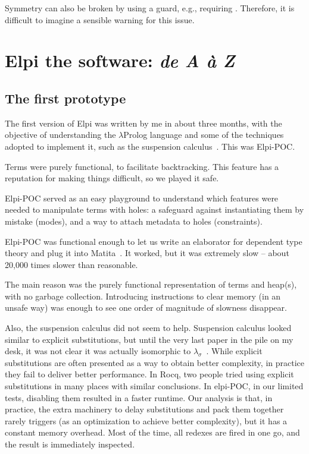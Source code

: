 \documentclass[a4paper, 11pt]{book}
\begin{document}
Symmetry can also be broken by using a guard, e.g., requiring
. Therefore, it is difficult to imagine a sensible warning for
this issue.



\chapter{Elpi the software: \emph{de A \`a Z}}

\section{The first prototype}\label{sec:poc}


The first version of Elpi was written by me in about three months, with the
objective of understanding the $\lambda$Prolog language and some of the
techniques adopted to implement it, such as the suspension
calculus~\cite{NADATHUR200235}. This was Elpi-POC.


Terms were purely functional, to facilitate backtracking. This feature has a
reputation for making things difficult, so we played it safe.


Elpi-POC served as an easy playground to understand which features were needed
to manipulate terms with holes: a safeguard against instantiating them by
mistake (modes), and a way to attach metadata to holes (constraints).


Elpi-POC was functional enough to let us write an elaborator for dependent type
theory and plug it into Matita~\cite{DBLP:conf/cade/AspertiRCT11}. It worked,
but it was extremely slow -- about 20,000 times slower than reasonable.


The main reason was the purely functional representation of terms and heap(s),
with no garbage collection.
Introducing instructions to clear memory (in an unsafe way) was enough to see
one order of magnitude of slowness disappear.


Also, the suspension calculus did not seem to help. Suspension calculus looked
similar to explicit substitutions, but until the very last paper in the pile on
my desk, it was not clear it was actually isomorphic to
$\lambda_\sigma$~\cite{expsubst}. While explicit substitutions are often
presented as a way to obtain better complexity, in practice they fail to
deliver better performance. In Rocq, two people tried using explicit
substitutions in many places with similar conclusions. In elpi-POC, in our
limited tests, disabling them resulted in a faster runtime. Our analysis is
that, in practice, the extra machinery to delay substitutions and pack them
together rarely triggers (as an optimization to achieve better complexity), but
it has a constant memory overhead. Most of the time, all redexes are fired in
one go, and the result is immediately inspected.
\end{document}
